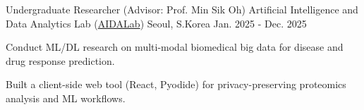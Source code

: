 

\begin{cventries}

  \cventry
    {Undergraduate Researcher (Advisor: Prof. Min Sik Oh)} %
    {Artificial Intelligence and Data Analytics Lab (\href{https://ailab-mju.github.io/}{\textcolor{awesome}{AIDALab}})} %
    {   Seoul, S.Korea} %
    {Jan. 2025 - Dec. 2025} %
    {
      \begin{cvitems} %
        \item {Conduct ML/DL research on multi-modal biomedical big data for disease and drug response prediction.}
        \item {Built a client-side web tool (React, Pyodide) for privacy-preserving proteomics analysis and ML workflows.}
      \end{cvitems}
    }

\end{cventries}
